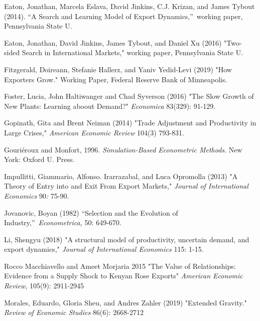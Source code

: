\documentclass[12pt]{article}
\begin{document}
\begin{description}
\item Eaton, Jonathan, Marcela Eslava, David Jinkins, C.J. Krizan, and James
Tybout (2014). \textquotedblleft A Search and Learning Model of Export
Dynamics,\textquotedblright\ working paper, Pennsylvania State U.

\item Eaton, Jonathan, David Jinkins, James Tybout, and Daniel Xu (2016)
"Two-sided Search in International Markets," working paper, Pennsylvania
State U.

\item Fitzgerald, Doireann, Stefanie Hallerz, and Yaniv Yedid-Levi (2019)
"How Exporters Grow." Working Paper, Federal Reserve Bank of Minneapolis.

\item Foster, Lucia, John Haltiwanger and Chad Syverson (2016) "The Slow
Growth of New Plants: Learning aboout Demand?" \textit{Economica} 83(329):
91-129.

\item Gopinath, Gita and Brent Neiman (2014) "Trade Adjustment and
Productivity in Large Crises," \textit{American Economic Review} 104(3)
793-831.

\item Gouri\'{e}roux and Monfort, 1996. \textit{Simulation-Based Econometric
Methods}. New York: Oxford U. Press.

\item Impullitti, Giammario, Alfonso. Irarrazabal, and Luca Opromolla (2013)
"A Theory of Entry into and Exit From Export Markets," \textit{Journal of
International Economics} 90\textit{: }75-90.

\item Jovanovic, Boyan (1982) \textquotedblleft Selection and the Evolution
of Industry,\textquotedblright\ \textit{Econometrica,} 50: 649-670.

\item Li, Shengyu (2018) "A structural model of productivity, uncertain
demand, and export dynamics," \textit{Journal of International Economics}
115: 1-15.

\item Rocco Macchiavello and Ameet Morjaria 2015 "The Value of
Relationships: Evidence from a Supply Shock to Kenyan Rose Exports" \textit{%
American Economic Review}, 105(9): 2911-2945

\item Morales, Eduardo, Gloria Sheu, and Andres Zahler (2019) "Extended
Gravity." \textit{Review of Economic Studies} 86(6): 2668-2712


\end{description}
\end{document}
